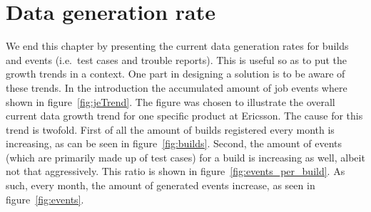%
%


%
%

\section{Data generation rate}
We end this chapter by presenting the current data generation rates for builds and events (i.e.\ test cases and trouble reports). This is useful so as to put the growth trends in a context. One part in designing a solution is to be aware of these trends. In the introduction the accumulated amount of job events where shown in figure~\ref{fig:jeTrend}. The figure was chosen to illustrate the overall current data growth trend for one specific product at Ericsson. The cause for this trend is twofold. First of all the amount of builds registered every month is increasing, as can be seen in figure~\ref{fig:builds}. Second, the amount of events (which are primarily made up of test cases) for a build is increasing as well, albeit not that aggressively. This ratio is shown in figure~\ref{fig:events_per_build}. As such, every month, the amount of generated events increase, as seen in figure~\ref{fig:events}.

